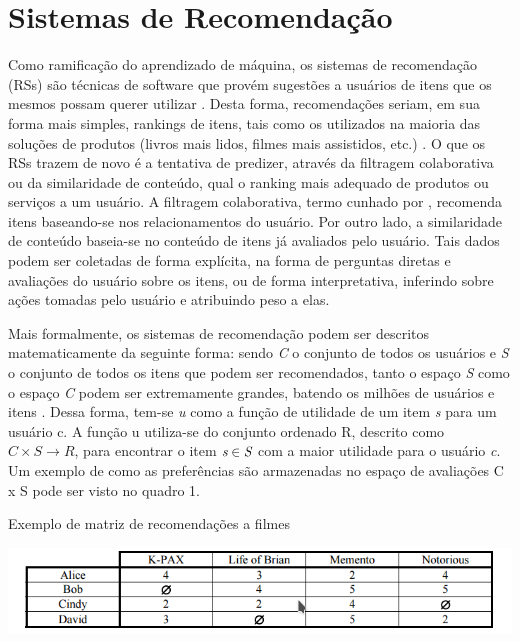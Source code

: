 \documentclass[12pt, openright, oneside, a4paper, brazil]{abntex2}
\begin{document}
\section{Sistemas de Recomendação} \label{recommender_systems}

Como ramificação do aprendizado de máquina, os sistemas de recomendação (RSs) são técnicas de software que provém sugestões a usuários de itens que os mesmos possam querer utilizar   \cite{resnick1997recommender, schafer1999recommender}. Desta forma, recomendações seriam, em sua forma mais simples, rankings de itens, tais como os utilizados na maioria das soluções de produtos (livros mais lidos, filmes mais assistidos, etc.) \cite{ricci2011introduction}. O que os RSs trazem de novo é a tentativa de predizer, através da filtragem colaborativa ou da similaridade de conteúdo, qual o ranking mais adequado de produtos ou serviços a um usuário. A filtragem colaborativa, termo cunhado por , recomenda itens baseando-se nos relacionamentos do usuário. Por outro lado, a similaridade de conteúdo baseia-se no conteúdo de itens já avaliados pelo usuário. Tais dados podem ser coletadas de forma explícita, na forma de perguntas diretas e avaliações do usuário sobre os itens, ou de forma interpretativa, inferindo sobre ações tomadas pelo usuário e atribuindo peso a elas.

Mais formalmente, os sistemas de recomendação podem ser descritos matematicamente da seguinte forma: sendo \emph{C} o conjunto de todos os usuários e \emph{S} o conjunto de todos os itens que podem ser recomendados, tanto o espaço \emph{S} como o espaço \emph{C} podem ser extremamente grandes, batendo os milhões de usuários e itens \cite{adomavicius2005toward, gomez2016netflix}. Dessa forma, tem-se \textit{u} como a função de utilidade de um item \emph{s} para um usuário c. A função u utiliza-se do conjunto ordenado R, descrito como $C \times S \rightarrow R$, para encontrar o item $\emph{s} \in \emph{S}$ com a maior utilidade para o usuário \emph{c}. Um exemplo de como as preferências são armazenadas no espaço de avaliações C x S pode ser visto no quadro 1.

\begin{quadro}[h!tp]

	\caption{\label{movie_matrix}Exemplo de matriz de recomendações a filmes}

	\begin{center}
		\includegraphics[scale=0.8]{images/movie_matrix.png}
	\end{center}


\end{quadro}
\end{document}
